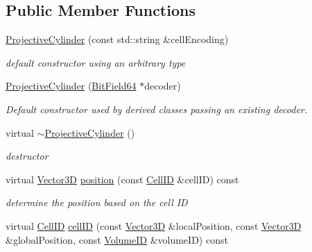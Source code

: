 \subsection*{Public Member Functions}
\begin{DoxyCompactItemize}
\item 
\hyperlink{class_d_d4hep_1_1_d_d_segmentation_1_1_projective_cylinder_ad99ec82db9b7ce8a7433bfa524c3040b}{ProjectiveCylinder} (const std::string \&cellEncoding)
\begin{DoxyCompactList}\small\item\em default constructor using an arbitrary type \item\end{DoxyCompactList}\item 
\hyperlink{class_d_d4hep_1_1_d_d_segmentation_1_1_projective_cylinder_afebb5add96b7e183f5e250e5e347f917}{ProjectiveCylinder} (\hyperlink{class_d_d4hep_1_1_d_d_segmentation_1_1_bit_field64}{BitField64} $\ast$decoder)
\begin{DoxyCompactList}\small\item\em Default constructor used by derived classes passing an existing decoder. \item\end{DoxyCompactList}\item 
virtual \hyperlink{class_d_d4hep_1_1_d_d_segmentation_1_1_projective_cylinder_a0177b7d45729494e87f22d74aa0f872a}{$\sim$ProjectiveCylinder} ()
\begin{DoxyCompactList}\small\item\em destructor \item\end{DoxyCompactList}\item 
virtual \hyperlink{struct_d_d4hep_1_1_d_d_segmentation_1_1_vector3_d}{Vector3D} \hyperlink{class_d_d4hep_1_1_d_d_segmentation_1_1_projective_cylinder_a4108a130ccc4573d4204318e975ad8bf}{position} (const \hyperlink{namespace_d_d4hep_1_1_d_d_segmentation_ac7af071d85cb48820914434a07e21ba1}{CellID} \&cellID) const 
\begin{DoxyCompactList}\small\item\em determine the position based on the cell ID \item\end{DoxyCompactList}\item 
virtual \hyperlink{namespace_d_d4hep_1_1_d_d_segmentation_ac7af071d85cb48820914434a07e21ba1}{CellID} \hyperlink{class_d_d4hep_1_1_d_d_segmentation_1_1_projective_cylinder_a5aaa84e94618e058c743cf5bd44db446}{cellID} (const \hyperlink{struct_d_d4hep_1_1_d_d_segmentation_1_1_vector3_d}{Vector3D} \&localPosition, const \hyperlink{struct_d_d4hep_1_1_d_d_segmentation_1_1_vector3_d}{Vector3D} \&globalPosition, const \hyperlink{namespace_d_d4hep_1_1_d_d_segmentation_a61a6833a18d1800bdef176595f83e3ba}{VolumeID} \&volumeID) const 

\end{DoxyCompactItemize}
